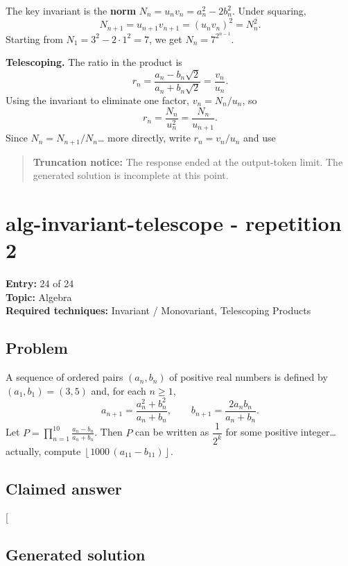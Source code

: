 \documentclass[
  11pt,
  letterpaper,
]{article}
\begin{document}
The key invariant is the \textbf{norm}
\(N_n = u_n v_n = a_n^2 - 2b_n^2\). Under squaring,
\[N_{n+1} = u_{n+1}v_{n+1} = (u_nv_n)^2 = N_n^2.\] Starting from
\(N_1 = 3^2 - 2\cdot1^2 = 7\), we get \(N_n = 7^{2^{n-1}}\).

\textbf{Telescoping.} The ratio in the product is
\[r_n = \frac{a_n - b_n\sqrt2}{a_n+b_n\sqrt2} = \frac{v_n}{u_n}.\] Using
the invariant to eliminate one factor, \(v_n = N_n/u_n\), so
\[r_n = \frac{N_n}{u_n^2} = \frac{N_n}{u_{n+1}}.\] Since
\(N_n = N_{n+1}/N_n\)\ldots{} more directly, write \(r_n = v_n/u_n\) and
use

\begin{quote}
\textbf{Truncation notice:} The response ended at the output-token
limit. The generated solution is incomplete at this point.
\end{quote}

\clearpage

\section{alg-invariant-telescope - repetition
2}\label{alg-invariant-telescope---repetition-2}

\textbf{Entry:} 24 of 24\\
\textbf{Topic:} Algebra\\
\textbf{Required techniques:} Invariant / Monovariant, Telescoping
Products

\subsection{Problem}\label{problem-23}

A sequence of ordered pairs \((a_n, b_n)\) of positive real numbers is
defined by \((a_1, b_1) = (3, 5)\) and, for each \(n \geq 1\),
\[a_{n+1} = \frac{a_n^2 + b_n^2}{a_n + b_n}, \qquad b_{n+1} = \frac{2a_n b_n}{a_n + b_n}.\]
Let \(P = \prod_{n=1}^{10} \frac{a_n - b_n}{a_n + b_n}\). Then \(P\) can
be written as \(\dfrac{1}{2^k}\) for some positive integer\ldots{}
actually, compute
\(\left\lfloor 1000\,(a_{11} - b_{11}) \right\rfloor\).

\subsection{Claimed answer}\label{claimed-answer-23}

{[}\boxed{0}{]}

\subsection{Generated solution}\label{generated-solution-23}
\end{document}
